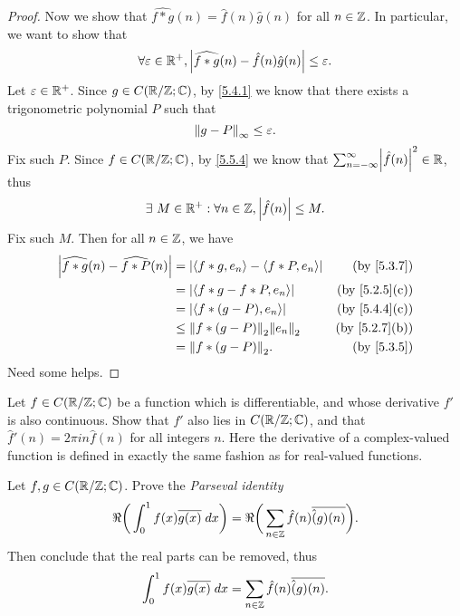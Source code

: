 \begin{proof}
  Now we show that \(\widehat{f * g}(n) = \hat{f}(n) \hat{g}(n)\) for all \(n \in \Z\).
  In particular, we want to show that
  \[
    \forall \varepsilon \in \R^+, \abs{\widehat{f * g}(n) - \hat{f}(n) \hat{g}(n)} \leq \varepsilon.
  \]
  Let \(\varepsilon \in \R^+\).
  Since \(g \in C(\R / \Z ; \C)\), by \cref{5.4.1} we know that there exists a trigonometric polynomial \(P\) such that
  \[
    \norm*{g - P}_{\infty} \leq \varepsilon.
  \]
  Fix such \(P\).
  Since \(f \in C(\R / \Z ; \C)\), by \cref{5.5.4} we know that \(\sum_{n = -\infty}^\infty \abs{\hat{f}(n)}^2 \in \R\), thus
  \[
    \exists\ M \in \R^+ : \forall n \in \Z, \abs{\hat{f}(n)} \leq M.
  \]
  Fix such \(M\).
  Then for all \(n \in \Z\), we have
  \begin{align*}
    \abs{\widehat{f * g}(n) - \widehat{f * P}(n)} & = \abs{\inner*{f * g, e_n} - \inner*{f * P, e_n}} & \text{(by \cref{5.3.7})}    \\
                                                  & = \abs{\inner*{f * g - f * P, e_n}}               & \text{(by \cref{5.2.5}(c))} \\
                                                  & = \abs{\inner*{f * (g - P), e_n}}                 & \text{(by \cref{5.4.4}(c))} \\
                                                  & \leq \norm*{f * (g - P)}_2 \norm*{e_n}_2          & \text{(by \cref{5.2.7}(b))} \\
                                                  & = \norm*{f * (g - P)}_2.                          & \text{(by \cref{5.3.5})}
  \end{align*}
  Need some helps.
\end{proof}

\begin{ex}\label{ex:5.5.4}
  Let \(f \in C(\R / \Z ; \C)\) be a function which is differentiable, and whose derivative \(f'\) is also continuous.
  Show that \(f'\) also lies in \(C(\R / \Z ; \C)\), and that \(\hat{f}'(n) = 2 \pi i n \hat{f}(n)\) for all integers \(n\).
  Here the derivative of a complex-valued function is defined in exactly the same fashion as for real-valued functions.
\end{ex}

\begin{ex}\label{ex:5.5.5}
  Let \(f, g \in C(\R / \Z ; \C)\).
  Prove the \emph{Parseval identity}
  \[
    \Re\bigg(\int_0^1 f(x) \overline{g(x)} \; dx\bigg) = \Re\bigg(\sum_{n \in \Z} \hat{f}(n) \overline{\hat(g)(n)}\bigg).
  \]
  Then conclude that the real parts can be removed, thus
  \[
    \int_0^1 f(x) \overline{g(x)} \; dx = \sum_{n \in \Z} \hat{f}(n) \overline{\hat(g)(n)}.
  \]
\end{ex}

